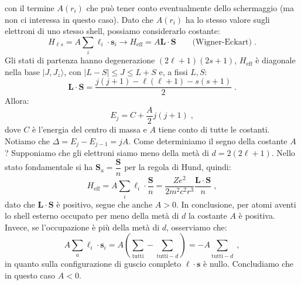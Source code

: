 \documentclass[10pt,a4paper]{report}
\theoremstyle{definition}
\numberwithin{equation}{section}
\newcommand{\ket}{\rangle}
\begin{document}
con il termine $A(r_i)$ che può tener conto eventualmente dello schermaggio (ma non ci interessa in questo caso). Dato che $A(r_i)$ ha lo stesso valore sugli elettroni di uno stesso shell, possiamo considerarlo costante:
\begin{equation}
H_{\ell s}=A\sum_i\boldsymbol{\ell}_i\cdot\mathbf{s}_i\longrightarrow H_{\mathrm{eff}}=A\mathbf{L}\cdot\mathbf{S}\qquad \mbox{(Wigner-Eckart)}\;.
\end{equation}
Gli stati di partenza hanno degenerazione $(2\ell+1)(2s+1)$, $H_{\mathrm{eff}}$ è diagonale nella base $|J,J_z\ket$, con $|L-S|\le J\le L+S$ e, a fissi $L,S$:
$$
\mathbf{L}\cdot\mathbf{S}=\frac{j(j+1)-\ell(\ell+1)-s(s+1)}{2}\;.
$$
Allora:
\begin{equation}
E_j=C+\frac{A}{2}j(j+1)\;,
\end{equation}
dove $C$ è l'energia del centro di massa e $A$ tiene conto di tutte le costanti. Notiamo che $\Delta=E_j-E_{j-1}=jA$. Come determiniamo il segno della costante $A$? Supponiamo che gli elettroni siamo meno della metà di $d=2(2\ell+1)$. Nello stato fondamentale si ha $\mathbf{S}_a=\dfrac{\mathbf{S}}{n}$ per la regola di Hund, quindi:
\begin{equation}
H_{\mathrm{eff}}=A\sum_i\boldsymbol{\ell}_i\cdot\frac{\mathbf{S}}{n}=\frac{Ze^2}{2m^2c^2r^3}\frac{\mathbf{L}\cdot\mathbf{S}}{n}\;,
\end{equation}
dato che $\mathbf{L}\cdot\mathbf{S}$ è positivo, segue che anche $A>0$. In conclusione, per atomi aventi lo shell esterno occupato per meno della metà di $d$ la costante $A$ è positiva. Invece, se l'occupazione è più della metà di $d$, osserviamo che:
\begin{equation}
A\sum_a\boldsymbol{\ell}_i\cdot\mathbf{s}_i=A\left(\sum_{\mathrm{tutti}}-\sum_{\mathrm{tutti}-d}\right)=-A\sum_{\mathrm{tutti}-d}\;,
\end{equation}
in quanto sulla configurazione di guscio completo $\boldsymbol{\ell}\cdot\mathbf{s}$ è nullo. Concludiamo che in questo caso $A<0$.
\end{document}
